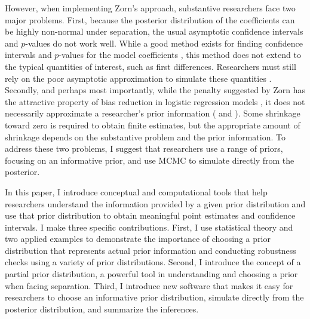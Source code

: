 \documentclass[12pt]{article}
\begin{document}
However, when implementing Zorn's approach, substantive researchers face two major problems. 
First, because the posterior distribution of the coefficients can be highly non-normal under separation, the usual asymptotic confidence intervals and $p$-values do not work well. 
While a good method exists for finding confidence intervals and $p$-values for the model coefficients \citep{HeinzeSchemper2002}, this method does not extend to the typical quantities of interest, such as first differences. 
Researchers must still rely on the poor asymptotic approximation to simulate these quantities \citep{KingTomzWittenberg2000}.  
Secondly, and perhaps most importantly, while the penalty suggested by Zorn has the attractive property of bias reduction in logistic regression models \citep{Firth1993}, it does not necessarily approximate a researcher's prior information (\citealt{WesternJackman1994} and \citealt{Gelmanetal2008}). 
Some shrinkage toward zero is required to obtain finite estimates, but the appropriate amount of shrinkage depends on the substantive problem and the prior information. 
To address these two problems, I suggest that researchers use a range of priors, focusing on an informative prior, and use MCMC to simulate directly from the posterior.

In this paper, I introduce conceptual and computational tools that help researchers understand the information provided by a given prior distribution and use that prior distribution to obtain meaningful point estimates and confidence intervals. 
I make three specific contributions. 
First, I use statistical theory and two applied examples to demonstrate the importance of choosing a prior distribution that represents actual prior information and conducting robustness checks using a variety of prior distributions. 
Second, I introduce the concept of a partial prior distribution, a powerful tool in understanding and choosing a prior when facing separation. 
Third, I introduce new software that makes it easy for researchers to choose an informative prior distribution, simulate directly from the posterior distribution, and summarize the inferences.%
\end{document}
